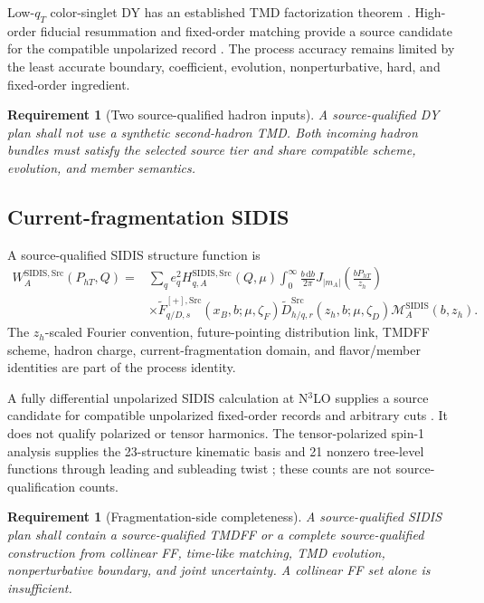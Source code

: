 \documentclass[11pt]{article}
\newtheorem{requirement}[definition]{Requirement}
\newcommand{\dd}{\mathrm{d}}
\newcommand{\SIDIS}{\ensuremath{\mathrm{SIDIS}}}
\newcommand{\cM}{\mathcal M}
\newcommand{\Src}{\ensuremath{\mathrm{Src}}}
\begin{document}
Low-\(q_T\) color-singlet DY has an established TMD factorization theorem \cite{CollinsDY2011}.  High-order fiducial resummation and fixed-order matching provide a source candidate for the compatible unpolarized record \cite{Neumann2022}.  The process accuracy remains limited by the least accurate boundary, coefficient, evolution, nonperturbative, hard, and fixed-order ingredient.

\begin{requirement}[Two source-qualified hadron inputs]
A source-qualified DY plan shall not use a synthetic second-hadron TMD.  Both incoming hadron bundles must satisfy the selected source tier and share compatible scheme, evolution, and member semantics.
\end{requirement}

\subsection{Current-fragmentation SIDIS}

A source-qualified SIDIS structure function is
\begin{align}
 W_A^{\SIDIS,\Src}(P_{hT},Q)
 ={}&
 \sum_q e_q^2
 H_{q,A}^{\SIDIS,\Src}(Q,\mu)
 \int_0^\infty\frac{b\,\dd b}{2\pi}
 J_{|m_A|}\!\left(\frac{bP_{hT}}{z_h}\right)
 \nonumber\\
 &\times
 \widetilde F_{q/D,s}^{[+],\Src}
 (x_B,b;\mu,\zeta_F)
 \widetilde D_{h/q,r}^{\Src}
 (z_h,b;\mu,\zeta_D)
 \cM_A^{\SIDIS}(b,z_h).
 \label{eq:source-sidis-w}
\end{align}
The \(z_h\)-scaled Fourier convention, future-pointing distribution link, TMDFF scheme, hadron charge, current-fragmentation domain, and flavor/member identities are part of the process identity.

A fully differential unpolarized SIDIS calculation at N\(^3\)LO supplies a source candidate for compatible unpolarized fixed-order records and arbitrary cuts \cite{Dong2026}.  It does not qualify polarized or tensor harmonics.  The tensor-polarized spin-1 analysis supplies the 23-structure kinematic basis and 21 nonzero tree-level functions through leading and subleading twist \cite{Zhao2025}; these counts are not source-qualification counts.

\begin{requirement}[Fragmentation-side completeness]
A source-qualified SIDIS plan shall contain a source-qualified TMDFF or a complete source-qualified construction from collinear FF, time-like matching, TMD evolution, nonperturbative boundary, and joint uncertainty.  A collinear FF set alone is insufficient.
\end{requirement}
\end{document}
